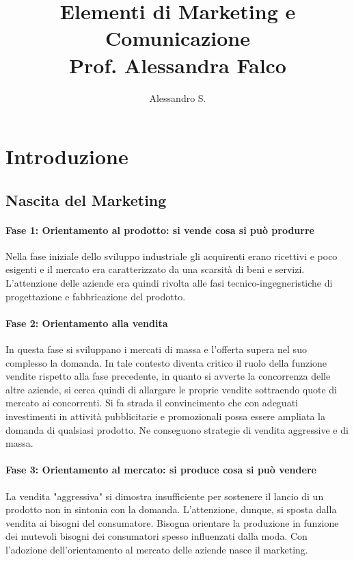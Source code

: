 

\title{Elementi di Marketing e Comunicazione \\
\small{Prof. Alessandra Falco}}

\author{Alessandro S.}



\maketitle
\tableofcontents
\clearpage

\chapter{Introduzione}
\section{Nascita del Marketing}
\subsubsection*{Fase 1: Orientamento al prodotto: si vende cosa si può produrre}
Nella fase iniziale dello sviluppo industriale gli acquirenti erano ricettivi e poco esigenti e il mercato era caratterizzato da una scarsità di beni e servizi. L'attenzione delle aziende era quindi rivolta alle fasi tecnico-ingegneristiche di progettazione e fabbricazione del prodotto.

\subsubsection*{Fase 2: Orientamento alla vendita}
In questa fase si sviluppano i mercati di massa e l'offerta supera nel suo complesso la domanda. In tale contesto diventa critico il ruolo della funzione vendite rispetto alla fase precedente, in quanto si avverte la concorrenza delle altre aziende, si cerca quindi di allargare le proprie vendite sottraendo quote di mercato ai concorrenti. \newline
Si fa strada il convincimento che con adeguati investimenti in attività pubblicitarie e promozionali possa essere ampliata la domanda di qualsiasi prodotto. Ne conseguono strategie di vendita aggressive e di massa.

\subsubsection*{Fase 3: Orientamento al mercato: si produce cosa si può vendere}
La vendita "aggressiva" si dimostra insufficiente per sostenere il lancio di un prodotto non in sintonia con la domanda. L'attenzione, dunque, si sposta dalla vendita ai bisogni del consumatore. Bisogna orientare la produzione in funzione dei mutevoli bisogni dei consumatori spesso influenzati dalla moda.\newline
Con l'adozione dell'orientamento al mercato delle aziende nasce il marketing.

